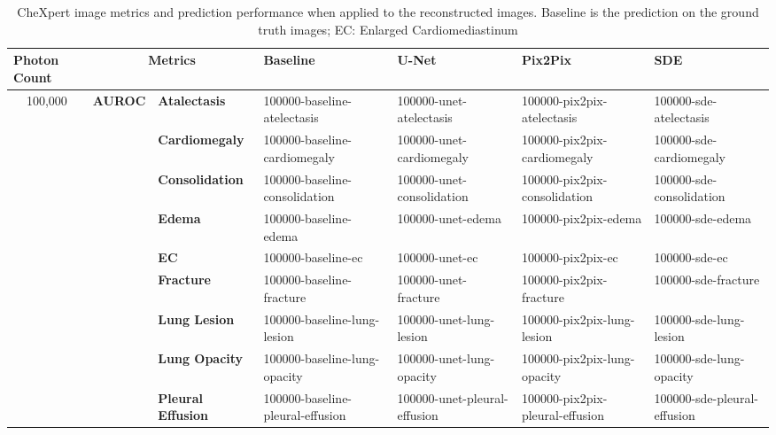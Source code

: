 \begin{table}[]
\centering
\caption{CheXpert image metrics and prediction performance when applied to the reconstructed images. Baseline is the prediction on the ground truth images; EC: Enlarged Cardiomediastinum}\label{tab:chex_perf}
\begin{tabular}{cll|llll}
\hline
\multicolumn{1}{l}{\textbf{Photon Count}} & \multicolumn{2}{c|}{\textbf{Metrics}}         & \textbf{Baseline} & \textbf{U-Net} & \textbf{Pix2Pix} & \textbf{SDE} \\ \hline
\multirow{15}{*}{100,000}               & \multirow{13}{*}{\textbf{AUROC}} & \textbf{Atalectasis}  & 100000-baseline-atelectasis & 100000-unet-atelectasis & 100000-pix2pix-atelectasis & 100000-sde-atelectasis \\
                                 &                        & \textbf{Cardiomegaly} & 100000-baseline-cardiomegaly & 100000-unet-cardiomegaly & 100000-pix2pix-cardiomegaly & 100000-sde-cardiomegaly \\
                                 &                        & \textbf{Consolidation} & 100000-baseline-consolidation & 100000-unet-consolidation & 100000-pix2pix-consolidation & 100000-sde-consolidation \\ 
                                 &                        & \textbf{Edema} & 100000-baseline-edema & 100000-unet-edema & 100000-pix2pix-edema & 100000-sde-edema \\ 
                                 &                        & \textbf{EC} & 100000-baseline-ec & 100000-unet-ec & 100000-pix2pix-ec & 100000-sde-ec \\ 
                                 &                        & \textbf{Fracture} & 100000-baseline-fracture & 100000-unet-fracture & 100000-pix2pix-fracture & 100000-sde-fracture \\ 
                                 &                        & \textbf{Lung Lesion} & 100000-baseline-lung-lesion & 100000-unet-lung-lesion & 100000-pix2pix-lung-lesion & 100000-sde-lung-lesion \\ 
                                 &                        & \textbf{Lung Opacity} & 100000-baseline-lung-opacity & 100000-unet-lung-opacity & 100000-pix2pix-lung-opacity & 100000-sde-lung-opacity \\ 
                                 &                        & \textbf{Pleural Effusion} & 100000-baseline-pleural-effusion & 100000-unet-pleural-effusion & 100000-pix2pix-pleural-effusion & 100000-sde-pleural-effusion \\ 

\end{tabular}
\end{table}
